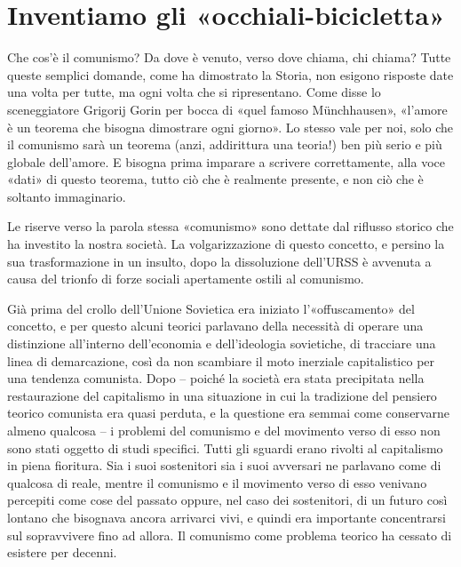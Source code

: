 \documentclass[../main]{subfiles}
\begin{document}
\ifSubfilesClassLoaded{\setcounter{page}{4}}{}
\section{Inventiamo gli «occhiali-bicicletta»}
\label{sec:01_inventiamo_occhiali}

Che cos'è il comunismo? Da dove è venuto, verso dove chiama, chi chiama? Tutte queste semplici domande, come ha dimostrato la Storia, non esigono risposte date una volta per tutte, ma ogni volta che si ripresentano. Come disse lo sceneggiatore Grigorij Gorin per bocca di «quel famoso Münchhausen», «l'amore è un teorema che bisogna dimostrare ogni giorno». Lo stesso vale per noi, solo che il comunismo sarà un teorema (anzi, addirittura una teoria!) ben più serio e più globale dell'amore. E bisogna prima imparare a scrivere correttamente, alla voce «dati» di questo teorema, tutto ciò che è realmente presente, e non ciò che è soltanto immaginario.

Le riserve verso la parola stessa «comunismo» sono dettate dal riflusso storico che ha investito la nostra società. La volgarizzazione di questo concetto, e persino la sua trasformazione in un insulto, dopo la dissoluzione dell'URSS è avvenuta a causa del trionfo di forze sociali apertamente ostili al comunismo.

Già prima del crollo dell'Unione Sovietica era iniziato l'«offuscamento» del concetto, e per questo alcuni teorici parlavano della necessità di operare una distinzione all'interno dell'economia e dell'ideologia sovietiche, di tracciare una linea di demarcazione, così da non scambiare il moto inerziale capitalistico per una tendenza comunista. Dopo – poiché la società era stata precipitata nella restaurazione del capitalismo in una situazione in cui la tradizione del pensiero teorico comunista era quasi perduta, e la questione era semmai come conservarne almeno qualcosa – i problemi del comunismo e del movimento verso di esso non sono stati oggetto di studi specifici. Tutti gli sguardi erano rivolti al capitalismo in piena fioritura. Sia i suoi sostenitori sia i suoi avversari ne parlavano come di qualcosa di reale, mentre il comunismo e il movimento verso di esso venivano percepiti come cose del passato oppure, nel caso dei sostenitori, di un futuro così lontano che bisognava ancora arrivarci vivi, e quindi era importante concentrarsi sul sopravvivere fino ad allora. Il comunismo come problema teorico ha cessato di esistere per decenni.
\end{document}
